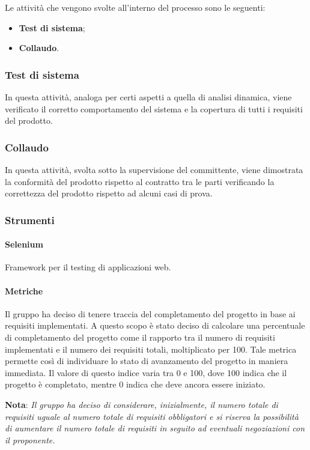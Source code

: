 Le attività che vengono svolte all'interno del processo sono le seguenti:
\begin{itemize}
	\item \textbf{Test di sistema};
	\item \textbf{Collaudo}.
\end{itemize}

\subsubsection{Test di sistema}
\label{ssub:validazione:test_sistema}

In questa attività, analoga per certi aspetti a quella di analisi dinamica, viene verificato il corretto comportamento del sistema e la 
copertura di tutti i requisiti del prodotto.

\subsubsection{Collaudo}
\label{ssub:validazione:collaudo}

In questa attività, svolta sotto la supervisione del committente, viene dimostrata la conformità del prodotto rispetto al contratto tra le 
parti verificando la correttezza del prodotto rispetto ad alcuni casi di prova.

\subsubsection{Strumenti}
\label{ssub:validazione:strumenti}

\paragraph{Selenium}
\label{par:verifica:selenium}

Framework per il testing di applicazioni web.

\paragraph{Metriche}

Il gruppo ha deciso di tenere traccia del completamento del progetto in base ai requisiti implementati. A questo scopo è 
stato deciso di calcolare una percentuale di completamento del progetto come il rapporto tra il numero di requisiti 
implementati e il numero dei requisiti totali, moltiplicato per 100. Tale metrica permette così di individuare lo stato 
di avanzamento del progetto in maniera immediata. Il valore di questo indice varia tra 0 e 100, dove 100 indica che il 
progetto è completato, mentre 0 indica che deve ancora essere iniziato.
\begin{center}
    \textbf{Nota}: \emph{Il gruppo ha deciso di considerare, inizialmente, il numero totale di requisiti uguale al numero totale di requisiti obbligatori e si riserva la 
    possibilità di aumentare il numero totale di requisiti in seguito ad eventuali negoziazioni con il proponente.}
\end{center}

